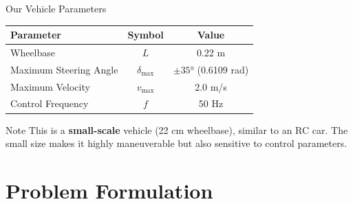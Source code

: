\documentclass[10pt]{beamer}
\begin{document}
\begin{frame}{Our Vehicle Parameters}
  \begin{table}
    \centering
    \begin{tabular}{lcc}
      \toprule
      \textbf{Parameter} & \textbf{Symbol} & \textbf{Value} \\
      \midrule
      Wheelbase & $L$ & 0.22 m \\
      Maximum Steering Angle & $\delta_{\max}$ & $\pm 35°$ (0.6109 rad) \\
      Maximum Velocity & $v_{\max}$ & 2.0 m/s \\
      Control Frequency & $f$ & 50 Hz \\
      \bottomrule
    \end{tabular}
  \end{table}

  \vspace{0.3cm}

  \begin{block}{Note}
    This is a \textbf{small-scale} vehicle (22 cm wheelbase), similar to an RC car. The small size makes it highly maneuverable but also sensitive to control parameters.
  \end{block}
\end{frame}

\section{Problem Formulation}
\end{document}
